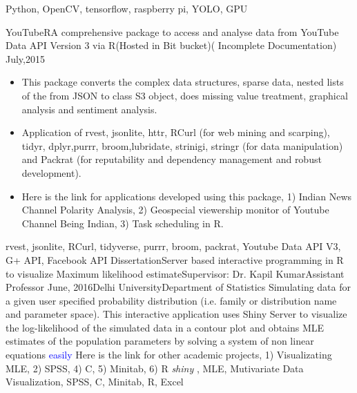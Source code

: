 \begin{experiences}
{\begin{itemize}
                      \end{itemize}
                    }
                    {Python, OpenCV, tensorflow, raspberry pi, YOLO, GPU}
  
  \emptySeparator
  \experience
    {YouTubeR}{A comprehensive package to access and analyse data from YouTube Data API Version 3 via R}{(Hosted in Bit bucket)}{( Incomplete Documentation)}
    {July,2015}    {
                      \begin{itemize}
                        \item This package converts the complex data structures, sparse data, nested lists of the from JSON to class S3 object, does missing value treatment, graphical analysis and sentiment analysis.
                        \item Application of rvest, jsonlite, httr, RCurl (for web mining and scarping), tidyr, dplyr,purrr, broom,lubridate, strinigi, stringr (for data manipulation) and Packrat (for reputability and dependency management and robust development).
                        \item Here is the link for applications developed using this package, 1) Indian News Channel Polarity Analysis, 2) Geospecial viewership monitor of Youtube Channel Being Indian, 3) Task scheduling in R.
                      \end{itemize}
                    }
                    {rvest, jsonlite, RCurl, tidyverse, purrr, broom, packrat, Youtube Data API V3, G+ API, Facebook API}
  \emptySeparator
  \consultantexperience
  {Dissertation}{Server based interactive programming in R to visualize Maximum likelihood estimate}{Supervisor: Dr. Kapil Kumar}{Assistant Professor}
  {June, 2016}{Delhi University}{Department of Statistics}{
                      Simulating data for a given user specified probability distribution (i.e. family or distribution name and parameter space). This interactive application uses Shiny Server to visualize the log-likelihood of the simulated data in a contour plot and obtains MLE estimates of the population parameters by solving a system of non linear equations \textcolor{blue}{easily}
                      \newline
                      Here is the link for other academic projects, 1) Visualizating MLE, 2) SPSS,  4) C, 5) Minitab, 6) R
                    }
                    {\emph{shiny} , MLE, Mutivariate Data Visualization, SPSS, C, Minitab, R, Excel}
\end{experiences}